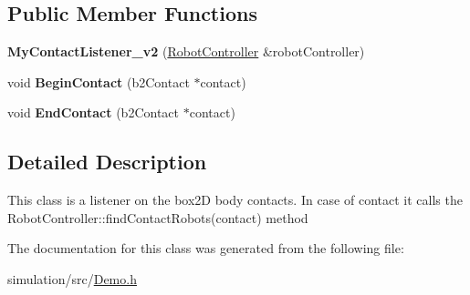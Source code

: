 \subsection*{Public Member Functions}
\begin{DoxyCompactItemize}
\item 
\mbox{\label{class_my_contact_listener__v2_a63de901c8048399d0808d5e37ec6d570}} 
{\bfseries My\+Contact\+Listener\+\_\+v2} (\mbox{\hyperlink{class_robot_controller}{Robot\+Controller}} \&robot\+Controller)
\item 
\mbox{\label{class_my_contact_listener__v2_ac776026bb2a50ca98ab21ca962bb5cf7}} 
void {\bfseries Begin\+Contact} (b2\+Contact $\ast$contact)
\item 
\mbox{\label{class_my_contact_listener__v2_a23897451bdb6e6505676a6ebb89cde90}} 
void {\bfseries End\+Contact} (b2\+Contact $\ast$contact)
\end{DoxyCompactItemize}


\subsection{Detailed Description}
This class is a listener on the box2D body contacts. In case of contact it calls the Robot\+Controller\+::find\+Contact\+Robots(contact) method 

The documentation for this class was generated from the following file\+:\begin{DoxyCompactItemize}
\item 
simulation/src/\mbox{\hyperlink{_demo_8h}{Demo.\+h}}\end{DoxyCompactItemize}
